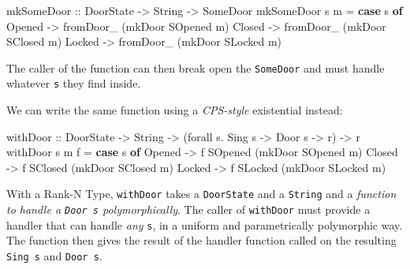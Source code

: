 \documentclass[]{article}
\newenvironment{Shaded}{}{}
\newcommand{\KeywordTok}[1]{\textcolor[rgb]{0.00,0.44,0.13}{\textbf{#1}}}
\newcommand{\DataTypeTok}[1]{\textcolor[rgb]{0.56,0.13,0.00}{#1}}
\newcommand{\OtherTok}[1]{\textcolor[rgb]{0.00,0.44,0.13}{#1}}
\newcommand{\FunctionTok}[1]{\textcolor[rgb]{0.02,0.16,0.49}{#1}}
\newcommand{\NormalTok}[1]{#1}
\begin{document}
\begin{Shaded}
\begin{Highlighting}[]
\NormalTok{mkSomeDoor}
\OtherTok{    ::} \DataTypeTok{DoorState}
    \OtherTok{->} \DataTypeTok{String}
    \OtherTok{->} \DataTypeTok{SomeDoor}
\NormalTok{mkSomeDoor s m }\FunctionTok{=} \KeywordTok{case}\NormalTok{ s }\KeywordTok{of}
    \DataTypeTok{Opened} \OtherTok{->}\NormalTok{ fromDoor_ (mkDoor }\DataTypeTok{SOpened}\NormalTok{ m)}
    \DataTypeTok{Closed} \OtherTok{->}\NormalTok{ fromDoor_ (mkDoor }\DataTypeTok{SClosed}\NormalTok{ m)}
    \DataTypeTok{Locked} \OtherTok{->}\NormalTok{ fromDoor_ (mkDoor }\DataTypeTok{SLocked}\NormalTok{ m)}
\end{Highlighting}
\end{Shaded}

The caller of the function can then break open the \texttt{SomeDoor} and must
handle whatever \texttt{s} they find inside.

We can write the same function using a \emph{CPS-style} existential instead:

\begin{Shaded}
\begin{Highlighting}[]
\NormalTok{withDoor}
\OtherTok{    ::} \DataTypeTok{DoorState}
    \OtherTok{->} \DataTypeTok{String}
    \OtherTok{->}\NormalTok{ (forall s}\FunctionTok{.} \DataTypeTok{Sing}\NormalTok{ s }\OtherTok{->} \DataTypeTok{Door}\NormalTok{ s }\OtherTok{->}\NormalTok{ r) }\OtherTok{->}\NormalTok{ r}
\NormalTok{withDoor s m f }\FunctionTok{=} \KeywordTok{case}\NormalTok{ s }\KeywordTok{of}
    \DataTypeTok{Opened} \OtherTok{->}\NormalTok{ f }\DataTypeTok{SOpened}\NormalTok{ (mkDoor }\DataTypeTok{SOpened}\NormalTok{ m)}
    \DataTypeTok{Closed} \OtherTok{->}\NormalTok{ f }\DataTypeTok{SClosed}\NormalTok{ (mkDoor }\DataTypeTok{SClosed}\NormalTok{ m)}
    \DataTypeTok{Locked} \OtherTok{->}\NormalTok{ f }\DataTypeTok{SLocked}\NormalTok{ (mkDoor }\DataTypeTok{SLocked}\NormalTok{ m)}
\end{Highlighting}
\end{Shaded}

With a Rank-N Type, \texttt{withDoor} takes a \texttt{DoorState} and a
\texttt{String} and a \emph{function to handle a \texttt{Door\ s}
polymorphically}. The caller of \texttt{withDoor} must provide a handler that
can handle \emph{any} \texttt{s}, in a uniform and parametrically polymorphic
way. The function then gives the result of the handler function called on the
resulting \texttt{Sing\ s} and \texttt{Door\ s}.
\end{document}
